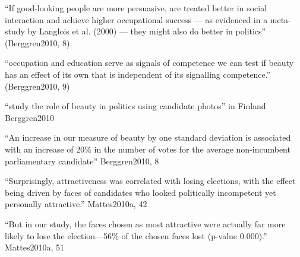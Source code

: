 ``If good-looking people are more persuasive, are treated better in social interaction and achieve higher occupational success — as evidenced in a meta-study by Langlois et al. (2000) — they might also do better in politics'' (Berggren2010, 8).

``occupation and education serve as signals of competence we can test if beauty has an effect of its own that is independent of its signalling competence.'' (Berggren2010, 9)


``study the role of beauty in politics using candidate photos'' in Finland Berggren2010

``An increase in our measure of beauty by one standard deviation is associated with an increase of 20\% in the number of votes for the average non-incumbent parliamentary candidate'' Berggren2010, 8


``Surprisingly, attractiveness was correlated with losing elections, with the effect being driven by faces of candidates who looked politically incompetent yet personally attractive.'' Mattes2010a, 42

``But in our study, the faces chosen as most attractive were actually far more likely to lose the election—56\% of the chosen faces lost (p-value 0.000).'' Mattes2010a, 51
